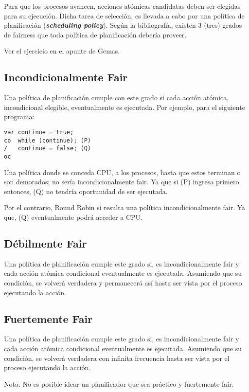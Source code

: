 \documentclass[a4paper, 10pt]{report}
\begin{document}
Para que los procesos avancen, acciones atómicas candidatas deben ser elegidas para su ejecución. Dicha tarea de selección, es llevada a cabo por una política de planificación (\textbf{\emph{scheduling policy}}). Según la bibliografía, existen 3 (tres) grados de fairness que toda política de planificación debería proveer.

\begin{basic_box}
     Ver el ejercicio en el apunte de Gemas.
\end{basic_box}

\subsection{Incondicionalmente Fair}

Una política de planificación cumple con este grado si cada acción atómica, incondicional elegible, eventualmente es ejecutada. Por ejemplo, para el siguiente programa:

\begin{lstlisting}
var continue = true;
co  while (continue); (P)
/   continue = false; (Q)
oc
\end{lstlisting}


Una política donde se conceda CPU, a los procesos, hasta que estos terminan o son demorados; no sería incondicionalmente fair. Ya que si (P) ingresa primero entonces, (Q) no tendría oportunidad de ser ejecutada.

Por el contrario, Round Robin si resulta una política incondicionalmente fair. Ya que, (Q) eventualmente podrá acceder a CPU.

\subsection{Débilmente Fair}

Una política de planificación cumple este grado si, es incondicionalmente fair y cada acción atómica condicional eventualmente es ejecutada. Asumiendo que su condición, se volverá verdadera y permanecerá así hasta ser vista por el proceso ejecutando la acción.

\subsection{Fuertemente Fair}

Una política de planificación cumple este grado si, es incondicionalmente fair y cada acción atómica condicional eventualmente es ejecutada. Asumiendo que su condición, se volverá verdadera con infinita frecuencia hasta ser vista por el proceso ejecutando la acción.

Nota: No es posible idear un planificador que sea práctico y fuertemente fair.
\end{document}
